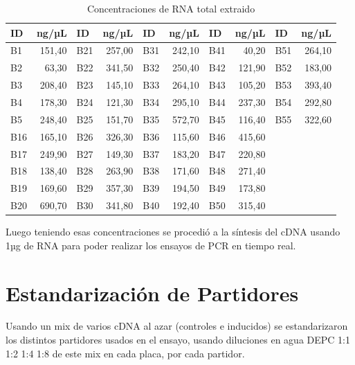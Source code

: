 \documentclass[12pt,a4paper,oneside]{scrbook}
\begin{document}
\begin{table}[h!]
\sffamily
\begin{center}
    \begin{threeparttable}
      \caption{Concentraciones de RNA total extraido}\label{tablaRNA}
      \begin{tabular}{l r l r l r l r l r}
    \toprule
    \textbf{ID} & \textbf{ng/µL} & \textbf{ID} & \textbf{ng/µL} & \textbf{ID} & \textbf{ng/µL} & \textbf{ID} & \textbf{ng/µL} & \textbf{ID} & \textbf{ng/µL}\\
    \midrule
    B1 & 151,40 & B21 & 257,00 & B31 & 242,10 & B41 & 40,20 & B51 & 264,10 \\
    B2 & 63,30 & B22 & 341,50 & B32 & 250,40 & B42 & 121,90 & B52 & 183,00 \\
    B3 & 208,40 & B23 & 145,10 & B33 & 264,10 & B43 & 105,20 & B53 & 393,40 \\
    B4 & 178,30 & B24 & 121,30 & B34 & 295,10 & B44 & 237,30 & B54 & 292,80 \\
    B5 & 248,40 & B25 & 151,70 & B35 & 572,70 & B45 & 116,40 & B55 & 322,60 \\
    B16 & 165,10 & B26 & 326,30 & B36 & 115,60 & B46 & 415,60 & \\
    B17 & 249,90 & B27 & 149,30 & B37 & 183,20 & B47 & 220,80 & \\
    B18 & 138,40 & B28 & 263,90 & B38 & 171,60 & B48 & 271,40 & \\
    B19 & 169,60 & B29 & 357,30 & B39 & 194,50 & B49 & 173,80 & \\
    B20 & 690,70 & B30 & 341,80 & B40 & 192,40 & B50 & 315,40 & \\
\bottomrule
\end{tabular}
\end{threeparttable}
\end{center}
\end{table}

Luego teniendo esas concentraciones se procedió a la síntesis del cDNA
usando 1µg de RNA para poder realizar los ensayos de PCR en tiempo real.

\section{Estandarización de Partidores}

Usando un mix de varios cDNA al azar (controles e inducidos) se
estandarizaron los distintos partidores usados en el ensayo, usando
diluciones en agua DEPC 1:1 1:2 1:4 1:8 de este mix en cada placa, por
cada partidor.
\end{document}
